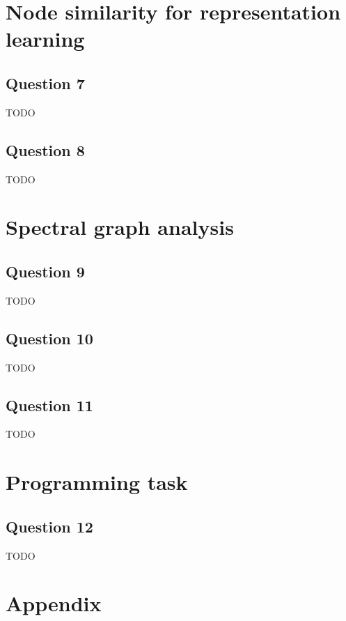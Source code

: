 \documentclass{article}
\begin{document}
\section{Node similarity for representation learning}

\subsection{Question 7}
TODO

\subsection{Question 8}
TODO

\section{Spectral graph analysis}

\subsection{Question 9}
TODO

\subsection{Question 10}
TODO

\subsection{Question 11}
TODO

\section{Programming task}

\subsection{Question 12}
TODO

\newpage
\appendix

\section{Appendix}
\end{document}
